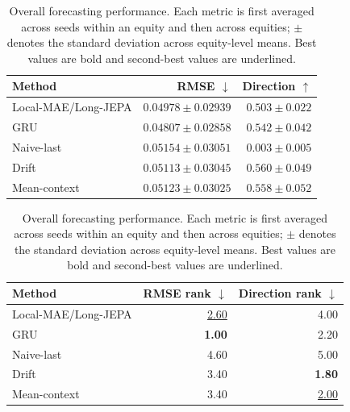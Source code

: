 \begin{table}[t]
\centering
\small
\caption{Overall forecasting performance. Each metric is first averaged across seeds within an equity and then across equities; $\pm$ denotes the standard deviation across equity-level means. Best values are bold and second-best values are underlined.}
\label{tab:main_metrics}
\begin{tabular}{lrr}
\toprule
Method & RMSE $\downarrow$ & Direction $\uparrow$ \\
\midrule
Local-MAE/Long-JEPA & \underline{$0.04978 \pm 0.02939$} & $0.503 \pm 0.022$ \\
GRU & \textbf{$0.04807 \pm 0.02858$} & $0.542 \pm 0.042$ \\
Naive-last & $0.05154 \pm 0.03051$ & $0.003 \pm 0.005$ \\
Drift & $0.05113 \pm 0.03045$ & \textbf{$0.560 \pm 0.049$} \\
Mean-context & $0.05123 \pm 0.03025$ & \underline{$0.558 \pm 0.052$} \\
\bottomrule
\end{tabular}
\par\medskip
\begin{tabular}{lrr}
\toprule
Method & RMSE rank $\downarrow$ & Direction rank $\downarrow$ \\
\midrule
Local-MAE/Long-JEPA & \underline{2.60} & 4.00 \\
GRU & \textbf{1.00} & 2.20 \\
Naive-last & 4.60 & 5.00 \\
Drift & 3.40 & \textbf{1.80} \\
Mean-context & 3.40 & \underline{2.00} \\
\bottomrule
\end{tabular}
\end{table}
